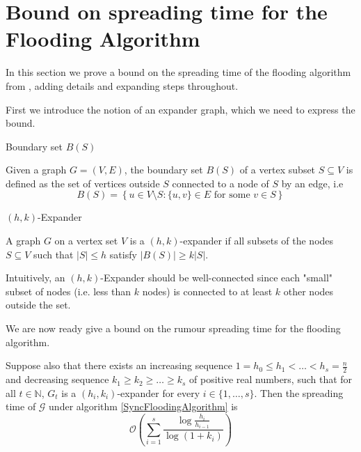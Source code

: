 

\section{Bound on spreading time for the Flooding Algorithm}

In this section we prove a bound on the spreading time of the flooding algorithm from \cite{syncPaper}, adding details and expanding steps throughout.

First we introduce the notion of an expander graph, which we need to express the bound.

\begin{definition}
	Boundary set $B(S)$

	\noindent 
	Given a graph $G=(V,E)$, the boundary set $B(S)$ of a vertex subset $S \subseteq V$ is defined as the set of vertices outside $S$ connected to a node of $S$ by an edge, i.e
	$$
		B(S) = \left\{u \in V \setminus S : \{u, v\} \in E \text{ for some } v \in S \right\}
	$$
\end{definition}


\begin{definition}
	$(h, k)$-Expander

	\noindent
	A graph $G$ on a vertex set $V$ is a $(h, k)$-expander if all subsets of the nodes $S \subseteq V$ such that $|S| \leq h$ satisfy $|B(S)| \geq k|S|$.
\end{definition}

Intuitively, an $(h, k)$-Expander should be well-connected since each "small" subset of nodes (i.e. less than $k$ nodes) is connected to at least $k$ other nodes outside the set.  

We are now ready give a bound on the rumour spreading time for the flooding algorithm.

\begin{theorem}\label{theorem:DeterministicFloodingBound}
	\ModelIntro Suppose also that there exists an increasing sequence $1 = h_0 \leq h_1 < \dots < h_s = \frac{n}{2}$ and decreasing sequence $k_1 \geq k_2 \geq \dots \geq k_s$ of positive real numbers, such that for all $t \in \mathbb{N}$, $G_t$ is a $(h_i, k_i)$-expander for every $i \in \{1, \dots , s\}$. Then the spreading time of $\mathcal{G}$ under algorithm \ref{SyncFloodingAlgorithm} is
	$$
		\mathcal{O}\left(\sum_{i=1}^s \frac{\log \frac{h_i}{h_{i-1}}}{\log(1+k_i)}\right)
	$$
\end{theorem}

